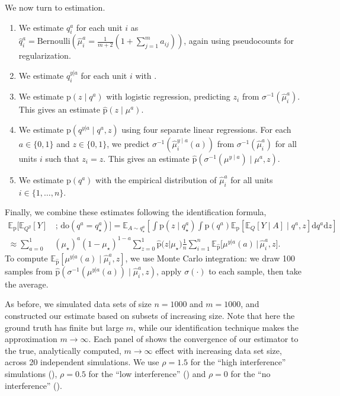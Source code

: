 \documentclass[12pt]{article}
\newcommand{\rmdo}{\mathrm{do}}
\newcommand{\s}{\, ; \,}
\newcommand{\di}{\mathrm{d}}
\newcommand{\pr}{\mathrm{p}}
\begin{document}
We now turn to estimation.
\begin{enumerate}[leftmargin=*]
	\item We estimate $q^{a}_i$ for each unit $i$ as $\hat{q}^{a}_i = \mathrm{Bernoulli}(\hat{\mu}^{a}_i = \frac{1}{m+2} (1 + \sum_{j=1}^m a_{ij}))$, again using pseudocounts for regularization.
	\item We estimate $q^{y| a}_i$ for each unit $i$ with .
	\item We estimate $\pr(z \mid q^{a})$ with logistic regression, predicting $z_i$ from $\sigma^{-1}(\hat{\mu}^{a}_i)$. This gives an estimate $\hat{\pr}(z \mid \mu^{a})$.
	\item We estimate $\pr(q^{y|a}\mid q^{a}, z)$ using four separate linear regressions. For each $a \in\{0, 1\}$ and $z \in \{0, 1\}$, we predict $\sigma^{-1}(\hat{\mu}^{y \mid a}_i(a))$ from $\sigma^{-1}(\hat{\mu}^{a}_i)$ for all units $i$ such that $z_i = z$. This gives an estimate $\hat{\pr}(\sigma^{-1}(\mu^{y \mid a}) \mid \mu^{a}, z)$.
	\item We estimate $\pr(q^a)$ with the empirical distribution of $\hat{\mu}^a_i$ for all units $i \in \{1, \ldots, n\}$.
\end{enumerate}
Finally, we combine these estimates following the identification formula,
\begin{equation*}
\begin{split}
\mathbb{E}_\pr[\mathbb{E}_{Q^y}[Y] &\s \rmdo(q^{a} = q_\star^a)]
=\mathbb{E}_{A \sim q_\star^a}\left[\int \pr(z\mid q_\star^a) \int \pr(q^a) \mathbb{E}_\pr[\mathbb{E}_Q[Y \mid A] \mid q^a, z] \di q^a \di z\right] \\ 
\approx \sum_{a = 0}^1 & (\mu_\star)^{a} (1 - \mu_\star)^{1 - a} \sum_{z=0}^1 \hat{\pr}\Big(z | \mu_\star\Big) \frac{1}{n}\sum_{i=1}^n \mathbb{E}_{\hat{\pr}}\Big[\mu^{y | a}(a)\, \Big|\, \hat{\mu}^{a}_i, z\Big].
\end{split}
\end{equation*}
To compute $ \mathbb{E}_{\hat{\pr}}[\mu^{y | a}(a) \mid \hat{\mu}^{a}_i, z]$, we use Monte Carlo integration: we draw 100 samples from $\hat{\pr}(\sigma^{-1}(\mu^{y | a}(a)) \mid \hat{\mu}^{a}_i, z)$, apply $\sigma(\cdot)$ to each sample, then take the average. 


As before, we simulated data sets of size $n = 1000$ and $m = 1000$, and constructed our estimate based on subsets of increasing size. Note that here the ground truth has finite but large $m$, while our identification technique makes the approximation $m \to \infty$.
Each panel of  shows the convergence of our estimator to the true, analytically computed, $m \to \infty$ effect with increasing data set size, across 20 independent simulations.
We use $\rho=1.5$ for the ``high interference'' simulations (), $\rho=0.5$ for the ``low interference'' () and $\rho=0$ for the ``no interference'' ().
\end{document}
